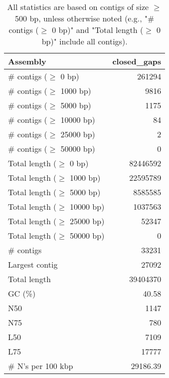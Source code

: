 \documentclass[12pt,a4paper]{article}
\begin{document}
\begin{table}[ht]
\begin{center}
\caption{All statistics are based on contigs of size $\geq$ 500 bp, unless otherwise noted (e.g., "\# contigs ($\geq$ 0 bp)" and "Total length ($\geq$ 0 bp)" include all contigs).}
\begin{tabular}{|l*{1}{|r}|}
\hline
Assembly & closed\_gaps \\ \hline
\# contigs ($\geq$ 0 bp) & 261294 \\ \hline
\# contigs ($\geq$ 1000 bp) & 9816 \\ \hline
\# contigs ($\geq$ 5000 bp) & 1175 \\ \hline
\# contigs ($\geq$ 10000 bp) & 84 \\ \hline
\# contigs ($\geq$ 25000 bp) & 2 \\ \hline
\# contigs ($\geq$ 50000 bp) & 0 \\ \hline
Total length ($\geq$ 0 bp) & 82446592 \\ \hline
Total length ($\geq$ 1000 bp) & 22595789 \\ \hline
Total length ($\geq$ 5000 bp) & 8585585 \\ \hline
Total length ($\geq$ 10000 bp) & 1037563 \\ \hline
Total length ($\geq$ 25000 bp) & 52347 \\ \hline
Total length ($\geq$ 50000 bp) & 0 \\ \hline
\# contigs & 33231 \\ \hline
Largest contig & 27092 \\ \hline
Total length & 39404370 \\ \hline
GC (\%) & 40.58 \\ \hline
N50 & 1147 \\ \hline
N75 & 780 \\ \hline
L50 & 7109 \\ \hline
L75 & 17777 \\ \hline
\# N's per 100 kbp & 29186.39 \\ \hline
\end{tabular}
\end{center}
\end{table}
\end{document}
